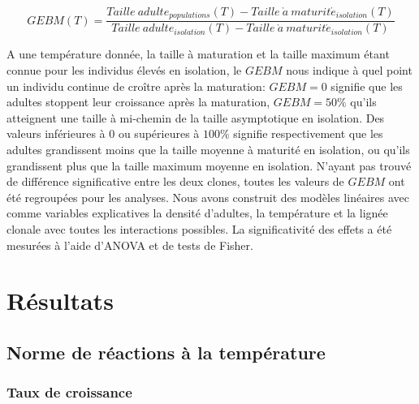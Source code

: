 \begin{equation}
GEBM(T) = \frac{Taille\ adulte_{populations}(T) -
Taille\ \grave{a} \ maturit\acute{e}_{isolation}(T)}{Taille\ adulte_{isolation}(T) -
Taille\ \grave{a} \ maturit\acute{e}_{isolation}(T)}
\end{equation}

A une température donnée, la taille à maturation et la taille maximum étant
connue pour les individus élevés en isolation, le $GEBM$ nous indique à quel
point un individu continue de croître après la maturation: $GEBM=0$ signifie que
les adultes stoppent leur croissance après la maturation, $GEBM=50\%$ qu'ils
atteignent une taille à mi-chemin de la taille asymptotique en isolation. Des
valeurs inférieures à 0 ou supérieures à $100\%$ signifie respectivement que les
adultes grandissent moins que la taille moyenne à maturité en isolation, ou
qu'ils grandissent plus que la taille maximum moyenne en isolation. N'ayant pas
trouvé de différence significative entre les deux clones, toutes les valeurs de
$GEBM$ ont été regroupées pour les analyses. Nous avons construit des modèles
linéaires avec comme variables explicatives la densité d'adultes, la
température et la lignée clonale avec toutes les interactions possibles. La
significativité des effets a été mesurées à l'aide d'ANOVA et de tests de
Fisher.

\section{Résultats}

\subsection{Norme de réactions à la température}

\subsubsection{Taux de croissance}

